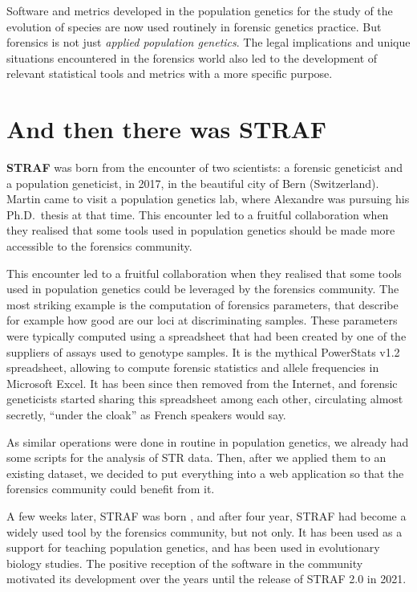 \documentclass[
]{book}
\begin{document}
Software and metrics developed in the population genetics for the study of the
evolution of species are now used routinely in forensic genetics practice.
But forensics is not just \emph{applied population genetics}. The legal implications
and unique situations encountered in the forensics world also led to the
development of relevant statistical tools and metrics with a more specific purpose.

\hypertarget{and-then-there-was-straf}{%
\section*{And then there was STRAF}\label{and-then-there-was-straf}}

\textbf{STRAF} was born from the encounter of two scientists: a forensic geneticist
and a population geneticist, in 2017, in the beautiful city of Bern (Switzerland).
Martin came to visit a population genetics lab, where Alexandre was pursuing
his Ph.D.~thesis at that time. This encounter led to a fruitful collaboration
when they realised that some tools used in population genetics should be
made more accessible to the forensics community.

This encounter led to a fruitful collaboration when they realised that some tools
used in population genetics could be leveraged by the forensics community. The
most striking example is the computation of forensics parameters, that describe
for example how good are our loci at discriminating samples. These
parameters were typically computed using a spreadsheet that had been created by
one of the suppliers of assays used to genotype samples. It is the mythical
PowerStats v1.2 spreadsheet, allowing to compute forensic statistics and allele
frequencies in Microsoft Excel. It has been since then removed from the Internet,
and forensic geneticists started sharing this spreadsheet among each other, circulating
almost secretly, ``under the cloak'' as French speakers would say.

As similar operations were done in routine in population genetics, we already had
some scripts for the analysis of STR data. Then, after we applied them to an existing
dataset, we decided to put everything into a web application so that the forensics
community could benefit from it.

A few weeks later, STRAF was born \citep{ref_straf}, and after four year, STRAF had become a
widely used tool by the forensics community, but not only.
It has been used as a support for teaching population genetics, and has
been used in evolutionary biology studies.
The positive reception of the software in the community motivated its
development over the years until the release of STRAF 2.0 in 2021.
\end{document}
